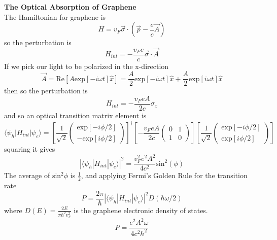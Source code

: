 \documentclass[a4paper,12pt]{article}
\begin{document}
\textbf{The Optical Absorption of Graphene} \\

The Hamiltonian for graphene is
\begin{equation}
H=v_F \vec{\sigma} \cdot (\vec{p}-\frac{e}{c}\vec{A})
\end{equation}
so the perturbation is
\begin{equation}
H_{int}=-\frac{v_F e}{c} \vec{\sigma} \cdot \vec{A}
\end{equation}
If we pick our light to be polarized in the x-direction
\begin{equation}
\vec{A}=\text{Re}[A \text{exp}[-i \omega t]\hat{x}]=\frac{A}{2}\text{exp}[-i \omega t]\hat{x}+\frac{A}{2}\text{exp}[i \omega t]\hat{x}
\end{equation}
then
so the perturbation is
\begin{equation}
H_{int}=-\frac{v_F e A}{2 c} \sigma_x
\end{equation}
and so an optical transition matrix element is
\begin{equation}
\langle \psi_h|H_{int}|\psi_e \rangle=
\left[ \frac{1}{\sqrt{2}} \left(
\begin{array}{c}
\text{exp}[-i \phi /2] \\
-\text{exp}[i \phi /2]
\end{array}
\right) \right]^{\dagger}
\left[ -\frac{v_F e A}{2 c} \left(
\begin{array}{cc}
0 & 1 \\
1 & 0
\end{array}
\right) \right]
\left[ \frac{1}{\sqrt{2}} \left(
\begin{array}{c}
\text{exp}[-i \phi /2] \\
\text{exp}[i \phi /2]
\end{array}
\right) \right]
\end{equation}
squaring it gives
\begin{equation}
|\langle \psi_h|H_{int}|\psi_e \rangle|^2= \frac{v_F^2 e^2 A^2}{4 c^2} \text{sin}^2(\phi) 
\end{equation}
The average of $\text{sin}^2{\phi}$ is $\frac{1}{2}$, and applying Fermi's Golden Rule for the transition rate
\begin{equation}
P=\frac{2 \pi}{\hbar} |\langle \psi_h|H_{int}|\psi_e \rangle|^2 D(\hbar \omega/2)
\end{equation}
where $D(E)=\frac{2 E}{\pi \hbar^2 v_F^2}$ is the graphene electronic density of states.
\begin{equation}
P=\frac{e^2 A^2 \omega}{4 c^2 \hbar^2}
\end{equation}
\end{document}
